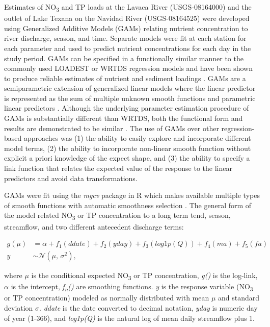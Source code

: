 \documentclass[water,article,submit,oneauthor]{Definitions/mdpi}
\begin{document}
Estimates of NO\textsubscript{3} and TP loads at the Lavaca River
(USGS-08164000) and the outlet of Lake Texana on the Navidad River
(USGS-08164525) were developed using Generalized Additive Models (GAMs)
relating nutrient concentration to river discharge, season, and time.
Separate models were fit at each station for each parameter and used to
predict nutrient concentrations for each day in the study period. GAMs
can be specified in a functionally similar manner to the commonly used
LOADEST \citep{cohn_validity_1992} or WRTDS \citep{hirsch_weighted_2010}
regression models and have been shown to produce reliable estimates of
nutrient and sediment loadings
\citep{wangLoadEstimationUncertainties2011, kroonRiverLoadsSuspended2012, kuhnert_quantifying_2012, robson_prediction_2015-1, hagemannEstimatingNutrientOrganic2016, mcdowell_implications_2021, biagi_novel_2022}.
GAMs are a semiparametric extension of generalized linear models where
the linear predictor is represented as the sum of multiple unknown
smooth functions and parametric linear predictors
\citep{wood_fast_2011}. Although the underlying parameter estimation
procedure of GAMs is substantially different than WRTDS, both the
functional form and results are demonstrated to be similar
\citep{beckNumericalQualitativeContrasts2017}. The use of GAMs over
other regression-based approaches was (1) the ability to easily explore
and incorporate different model terms, (2) the ability to incorporate
non-linear smooth function without explicit a priori knowledge of the
expect shape, and (3) the ability to specify a link function that
relates the expected value of the response to the linear predictors and
avoid data transformations.

GAMs were fit using the \emph{mgcv} package in R which makes available
multiple types of smooth functions with automatic smoothness selection
\citep{wood_fast_2011}. The general form of the model related
NO\textsubscript{3} or TP concentration to a long term tend, season,
streamflow, and two different antecedent discharge terms:

\begin{equation}\label{eq:1}
\begin{aligned}
g(\mu) &= \alpha + f_1(ddate) + f_2(yday) + f_3(log1p(Q)) + f_4(ma) + f_5(fa)  \\
y &\sim \mathcal{N}(\mu,\,\sigma^{2}),
\end{aligned}
\end{equation}

where \(\mu\) is the conditional expected NO\textsubscript{3} or TP
concentration, \emph{g()} is the log-link, \(\alpha\) is the intercept,
\emph{f\textsubscript{n}()} are smoothing functions. \emph{y} is the
response variable (NO\textsubscript{3} or TP concentration) modeled as
normally distributed with mean \(\mu\) and standard deviation
\(\sigma\). \emph{ddate} is the date converted to decimal notation,
\emph{yday} is numeric day of year (1-366), and \emph{log1p(Q)} is the
natural log of mean daily streamflow plus 1.
\end{document}
